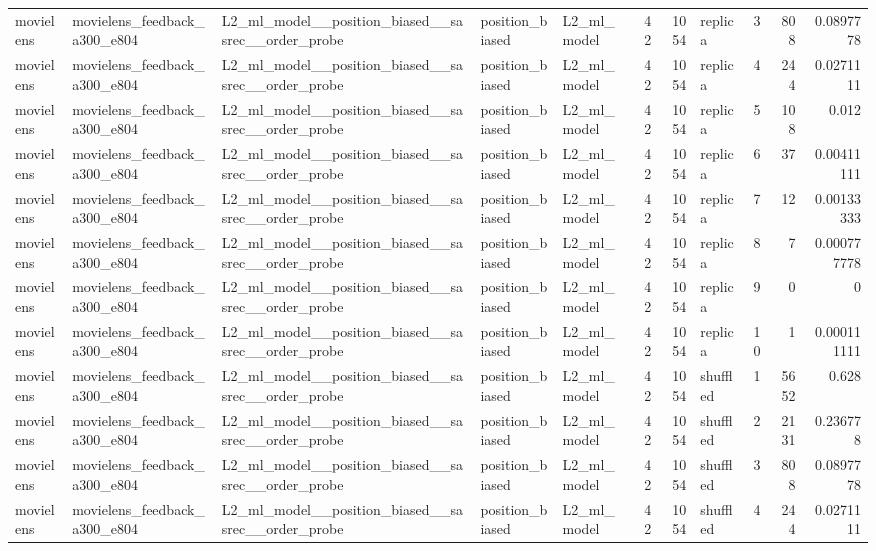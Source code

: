 \begin{table}[htbp!]
\begin{tabular}{lllllrrlrrr}
movielens & movielens\_feedback\_a300\_e804 & L2\_ml\_model\_\_position\_biased\_\_sasrec\_\_order\_probe & position\_biased & L2\_ml\_model & 42 & 1054 & replica & 3 & 808 & 0.0897778 \\
movielens & movielens\_feedback\_a300\_e804 & L2\_ml\_model\_\_position\_biased\_\_sasrec\_\_order\_probe & position\_biased & L2\_ml\_model & 42 & 1054 & replica & 4 & 244 & 0.0271111 \\
movielens & movielens\_feedback\_a300\_e804 & L2\_ml\_model\_\_position\_biased\_\_sasrec\_\_order\_probe & position\_biased & L2\_ml\_model & 42 & 1054 & replica & 5 & 108 & 0.012 \\
movielens & movielens\_feedback\_a300\_e804 & L2\_ml\_model\_\_position\_biased\_\_sasrec\_\_order\_probe & position\_biased & L2\_ml\_model & 42 & 1054 & replica & 6 & 37 & 0.00411111 \\
movielens & movielens\_feedback\_a300\_e804 & L2\_ml\_model\_\_position\_biased\_\_sasrec\_\_order\_probe & position\_biased & L2\_ml\_model & 42 & 1054 & replica & 7 & 12 & 0.00133333 \\
movielens & movielens\_feedback\_a300\_e804 & L2\_ml\_model\_\_position\_biased\_\_sasrec\_\_order\_probe & position\_biased & L2\_ml\_model & 42 & 1054 & replica & 8 & 7 & 0.000777778 \\
movielens & movielens\_feedback\_a300\_e804 & L2\_ml\_model\_\_position\_biased\_\_sasrec\_\_order\_probe & position\_biased & L2\_ml\_model & 42 & 1054 & replica & 9 & 0 & 0 \\
movielens & movielens\_feedback\_a300\_e804 & L2\_ml\_model\_\_position\_biased\_\_sasrec\_\_order\_probe & position\_biased & L2\_ml\_model & 42 & 1054 & replica & 10 & 1 & 0.000111111 \\
movielens & movielens\_feedback\_a300\_e804 & L2\_ml\_model\_\_position\_biased\_\_sasrec\_\_order\_probe & position\_biased & L2\_ml\_model & 42 & 1054 & shuffled & 1 & 5652 & 0.628 \\
movielens & movielens\_feedback\_a300\_e804 & L2\_ml\_model\_\_position\_biased\_\_sasrec\_\_order\_probe & position\_biased & L2\_ml\_model & 42 & 1054 & shuffled & 2 & 2131 & 0.236778 \\
movielens & movielens\_feedback\_a300\_e804 & L2\_ml\_model\_\_position\_biased\_\_sasrec\_\_order\_probe & position\_biased & L2\_ml\_model & 42 & 1054 & shuffled & 3 & 808 & 0.0897778 \\
movielens & movielens\_feedback\_a300\_e804 & L2\_ml\_model\_\_position\_biased\_\_sasrec\_\_order\_probe & position\_biased & L2\_ml\_model & 42 & 1054 & shuffled & 4 & 244 & 0.0271111 \\

\end{tabular}
\end{table}
